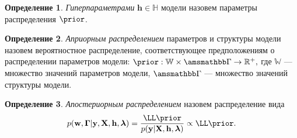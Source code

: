\documentclass[11pt, a5paper]{dissert}
\theoremstyle{definition}
\newtheorem{defin}{Определение}
\begin{document}

\begin{defin}
\textit{Гиперпараметрами} $\mathbf{h}\in \mathbb{H}$ модели  назовем параметры распределения $\prior$.
\end{defin}

\begin{defin}
\textit{Априорным распределением} параметров и структуры модели назовем вероятностное распределение, соответствующее предположениям о распределении параметров модели:
$
    \prior: \mathbb{W} \times \Gb \to \mathbb{R}^{+}, 
$
где $\mathbb{W}$ --- множество значений параметров модели, $\Gb$ --- множество значений структуры модели.%
\end{defin}



\begin{defin}
\textit{Апостериорным распределением} назовем распределение вида
\begin{equation}
\label{eq:posterior}
    \post = \frac{\LL \prior}{\EV} \propto \LL \prior.%
\end{equation}
\end{defin}


 
\end{document}
